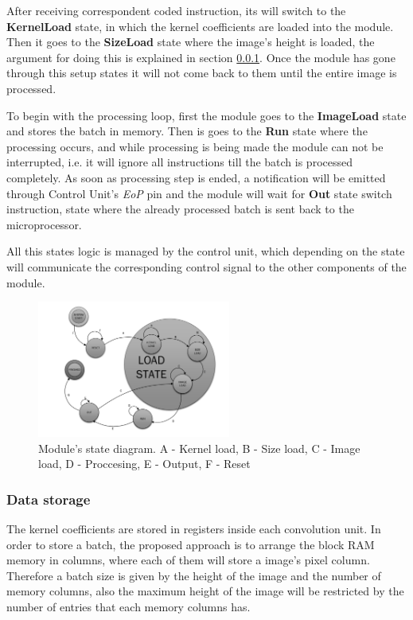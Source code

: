 \documentclass[conference,compsoc]{IEEEtran}
\begin{document}

After receiving correspondent coded instruction, its will switch to the \textbf{KernelLoad} state,
in which the kernel coefficients are loaded into the module. Then it goes to the \textbf{SizeLoad}
state where the image's height is loaded, the argument for doing this is explained in
section \ref{infstorage}. Once the module has gone through this setup states it
will not come back to them until the entire image is processed.

To begin with the processing loop, first the module goes to the \textbf{ImageLoad} state and
stores the batch in memory. Then is goes to the \textbf{Run} state where the
processing occurs, and while processing is being made the module can not be interrupted, i.e.
it will ignore all instructions till the batch is processed completely. As soon as 
processing step is ended, a notification will be emitted through Control Unit's
\textit{EoP} pin and the module will wait for \textbf{Out} state switch instruction, state where the 
already processed batch is sent back to the microprocessor.

All this states logic is managed by the control unit, which depending on the
state will communicate the corresponding control signal to the other components
of the module.

\begin{figure}[!t]
  \centering
  \includegraphics[width=2.5in]{states.pdf}
  \caption{Module's state diagram.
    A - Kernel load, B - Size load, C - Image load, D - Proccesing, E - Output,
    F - Reset}
  \label{state}
\end{figure}

\subsubsection{Data storage}\label{infstorage}
The kernel coefficients are stored in registers inside each convolution unit. In
order to store a batch, the proposed approach is to arrange the block RAM memory
in columns, where each of them will store a image's pixel column. Therefore a
batch size is given by the height of the image and the number of memory columns,
also the maximum height of the image will be restricted by the number of entries
that each memory columns has.
\end{document}
